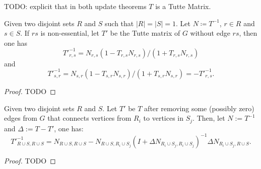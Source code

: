 TODO: explicit that in both update theorems \(T\) is a Tutte Matrix.

\begin{theorem}[Update 1]
    Given two disjoint sets \(R\) and \(S\) such that \(|R| = |S| = 1\).
    Let \(N \coloneqq T^{-1}\), \(r \in R\) and \(s \in S\).
    If \(rs\) is non-essential, let \(T'\) be the Tutte matrix of \(G\) without edge \(rs\), then one has
    \[
        T'^{-1}_{r, s} = N_{r, s} (1 - T_{r, s} N_{r, s}) / (1 + T_{r, s} N_{r, s})
    \]
    and
    \[
        T'^{-1}_{s, r} = N_{s, r} (1 - T_{s, r} N_{s, r}) / (1 + T_{s, r} N_{s, r}) = -T'^{-1}_{r, s}.
    \]
\end{theorem}

\begin{proof}
    TODO
\end{proof}

\begin{theorem}[Update 2]
    Given two disjoint sets \(R\) and \(S\). Let \(T'\) be \(T\) after removing some (possibly zero) edges from \(G\) that connects vertices from \(R_i\) to vertices in \(S_j\).
    Then, let \(N := T^{-1}\) and \(\Delta := T - T'\), one has:
    \[
        T'^{-1}_{R \cup S, R \cup S} = N_{R \cup S, R \cup S} - N_{R \cup S, R_i \cup S_j}(I + \Delta N_{R_i \cup S_j, R_i \cup S_j})^{-1} \Delta N_{R_i \cup S_j, R \cup S}.
    \]
\end{theorem}

\begin{proof}
    TODO
\end{proof}

